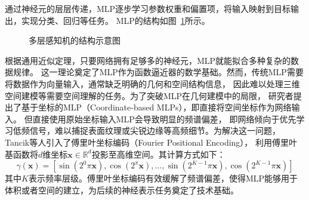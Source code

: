 通过神经元的层层传递，MLP逐步学习参数权重和偏置项，将输入映射到目标输出，实现分类、回归等任务。
MLP的结构如图~\ref{fig:mlp}所示。

\begin{figure}[htb]
  \centering
\caption{多层感知机的结构示意图}
\label{fig:mlp}
\end{figure}

根据通用近似定理\cite{Hornik_1989}，只要网络拥有足够多的神经元，MLP就能拟合多种复杂的数据规律。
这一理论奠定了MLP作为函数逼近器的数学基础。然而，传统MLP需要将数据作为向量输入，通常缺乏明确的几何和空间结构信息，
因此难以处理三维空间建模等需要空间理解的任务。为了突破MLP在几何建模中的局限，
研究者提出了基于坐标的MLP（Coordinate-based MLPs），即直接将空间坐标作为网络输入。
但直接使用原始坐标输入MLP会导致明显的频谱偏差\cite{pmlr-v97-rahaman19a}，
即网络倾向于优先学习低频信号，难以捕捉表面纹理或尖锐边缘等高频细节。为解决这一问题，
Tancik等人\cite{tancik2020fourier}引入了傅里叶坐标编码（Fourier Positional Encoding），
利用傅里叶基函数将$d$维坐标$\boldsymbol{x}\in\mathbb{R}^d$投影至高维空间。其计算方式如下：
\begin{equation}
\gamma(\boldsymbol{x})=\left[\sin\left(2^0\pi \boldsymbol{x}\right),\cos\left(2^\pi \boldsymbol{x}\right),\ldots,\sin\left(2^{K-1}\pi \boldsymbol{x}\right),\cos\left(2^{K-1}\pi \boldsymbol{x}\right)\right]
\label{eq:fourier_encoding}
\end{equation}
其中$K$表示频率层级。傅里叶坐标编码有效缓解了频谱偏差，使得MLP能够用于体积或者空间的建立，为后续的神经表示任务奠定了技术基础。

